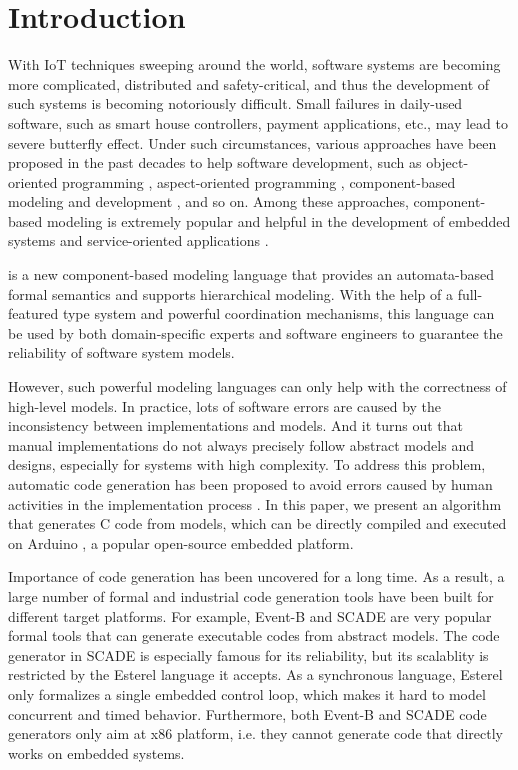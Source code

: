 \section{Introduction}

With IoT techniques sweeping around the world, software systems are becoming more complicated, distributed and safety-critical, and thus the development of such systems is becoming notoriously difficult. Small failures in daily-used software, such as smart house controllers, payment applications, etc., may lead to severe butterfly effect. Under such circumstances, various approaches have been proposed in the past decades to help software development, such as object-oriented programming \cite{SebestaConceptsOfPL}, aspect-oriented programming \cite{Kiczales1997}, component-based modeling and development \cite{SGM03}, and so on. Among these approaches, component-based modeling is extremely popular and helpful in the development of embedded systems \cite{Cmkovic2005} and service-oriented applications \cite{ACKM04}.

\lang{} \cite{LiFacsMediator2017} is a new component-based modeling language that provides an automata-based formal semantics and supports hierarchical modeling. With the help of a full-featured type system and powerful coordination mechanisms, this language can be used by both domain-specific experts and software engineers to guarantee the reliability of software system models.

However, such powerful modeling languages can only help with the correctness of high-level models. In practice, lots of software errors are caused by the inconsistency between implementations and models. And it turns out that manual implementations do not always precisely follow abstract models and designs, especially for systems with high complexity. To address this problem, automatic code generation has been proposed to avoid errors caused by human activities in the implementation process \cite{Budinsky1996}. In this paper, we present an algorithm that generates C code from \lang{} models, which can be directly compiled and executed on Arduino \cite{margolis2011arduino}, a popular open-source embedded platform.

Importance of code generation has been uncovered for a long time. As a result, a large number of formal and industrial code generation tools have been built for different target platforms. For example, Event-B \cite{FisherNfmEventBJava2016} and SCADE \cite{BerryScp1992} are very popular formal tools that can generate executable codes from abstract models. The code generator in SCADE is especially famous for its reliability, but its scalablity is restricted by the Esterel language it accepts. As a synchronous language, Esterel only formalizes a single embedded control loop, which makes it hard to model concurrent and timed behavior. Furthermore, both Event-B and SCADE code generators only aim at x86 platform, i.e. they cannot generate code that directly works on embedded systems. 

